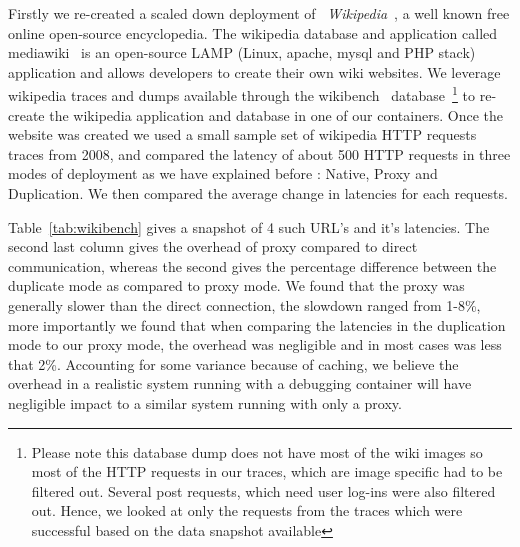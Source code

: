 Firstly we re-created a scaled down deployment of ~\emph{Wikipedia}~\cite{wikipedia}, a well known free online open-source encyclopedia. 
The wikipedia database and application called mediawiki~\cite{mediawiki} is an open-source LAMP (Linux, apache, mysql and PHP stack) application and allows developers to create their own wiki websites.
We leverage wikipedia traces and dumps available through the wikibench~\cite{wikibench} database~\footnote{Please note this database dump does not have most of the wiki images so most of the HTTP requests in our traces, which are image specific had to be filtered out. 
Several post requests, which need user log-ins were also filtered out. 
Hence, we looked at only the requests from the traces which were successful based on the data snapshot available} to re-create the wikipedia application and database in one of our containers.
Once the website was created we used a small sample set of wikipedia HTTP requests traces from 2008, and compared the latency of about 500 HTTP requests in three modes of deployment as we have explained before : Native, Proxy and Duplication. 
We then compared the average change in latencies for each requests.

Table~\ref{tab:wikibench} gives a snapshot of 4 such URL's and it's latencies. 
The second last column gives the overhead of proxy compared to direct communication, whereas the second gives the percentage difference between the duplicate mode as compared to proxy mode.
We found that the proxy was generally slower than the direct connection, the slowdown ranged from 1-8\%, more importantly we found that when comparing the latencies in the duplication mode to our proxy mode, the overhead was negligible and in most cases was less that 2\%. 
Accounting for some variance because of caching, we believe the overhead in a realistic system running with a debugging container will have negligible impact to a similar system running with only a proxy. 

